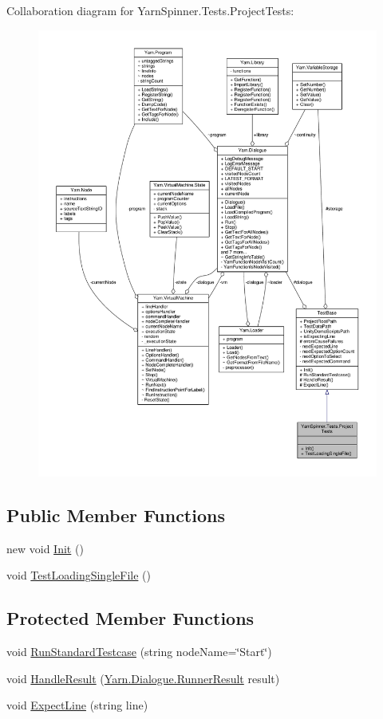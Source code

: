 Collaboration diagram for Yarn\-Spinner.\-Tests.\-Project\-Tests\-:
\nopagebreak
\begin{figure}[H]
\begin{center}
\leavevmode
\includegraphics[width=350pt]{a00729}
\end{center}
\end{figure}
\subsection*{Public Member Functions}
\begin{DoxyCompactItemize}
\item 
new void \hyperlink{a00139_a09fb3b241843b94176be710e4a2a6833}{Init} ()
\item 
void \hyperlink{a00139_a7d3dccb3f5ddf0b24e65782b7af15369}{Test\-Loading\-Single\-File} ()
\end{DoxyCompactItemize}
\subsection*{Protected Member Functions}
\begin{DoxyCompactItemize}
\item 
void \hyperlink{a00152_abffa134d40d72b21e6b35c3bf05fc53f}{Run\-Standard\-Testcase} (string node\-Name=\char`\"{}Start\char`\"{})
\item 
void \hyperlink{a00152_a7b525f85a26d7c942e1cbfa5d6453893}{Handle\-Result} (\hyperlink{a00141}{Yarn.\-Dialogue.\-Runner\-Result} result)
\item 
void \hyperlink{a00152_ac21a5082ddac1da9db17ae54038df44e}{Expect\-Line} (string line)
\end{DoxyCompactItemize}
